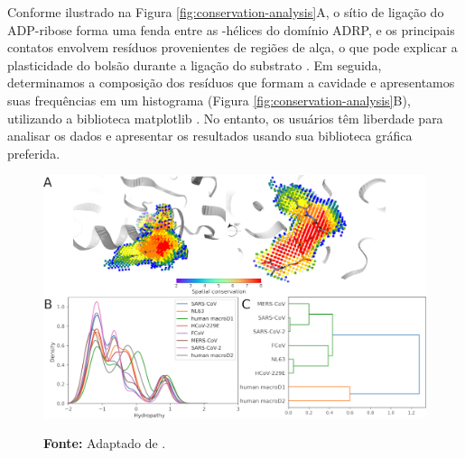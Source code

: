 \documentclass[Portugues]{phdquali}
\begin{document}
Conforme ilustrado na Figura \ref{fig:conservation-analysis}A, o sítio de ligação do ADP-ribose forma uma fenda entre as \textalpha-hélices do domínio ADRP, e os principais contatos envolvem resíduos provenientes de regiões de alça, o que pode explicar a plasticidade do bolsão durante a ligação do substrato \cite{michalska2020}. Em seguida, determinamos a composição dos resíduos que formam a cavidade e apresentamos suas frequências em um histograma (Figura \ref{fig:conservation-analysis}B), utilizando a biblioteca matplotlib \cite{matplotlib}. No entanto, os usuários têm liberdade para analisar os dados e apresentar os resultados usando sua biblioteca gráfica preferida.

\begin{figure}[hp]
  \centering
  \includegraphics[scale=0.4]{images/adrp-sars-cov-2-conservation-analysis.png}
  \centerline{\scriptsize{\textbf{Fonte:} Adaptado de \cite{guerra2021}.}}

\end{figure}
\end{document}
